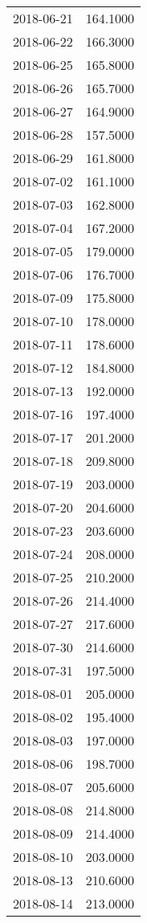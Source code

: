 \begin{tabular}{lr}
2018-06-21 &    164.1000 \\
2018-06-22 &    166.3000 \\
2018-06-25 &    165.8000 \\
2018-06-26 &    165.7000 \\
2018-06-27 &    164.9000 \\
2018-06-28 &    157.5000 \\
2018-06-29 &    161.8000 \\
2018-07-02 &    161.1000 \\
2018-07-03 &    162.8000 \\
2018-07-04 &    167.2000 \\
2018-07-05 &    179.0000 \\
2018-07-06 &    176.7000 \\
2018-07-09 &    175.8000 \\
2018-07-10 &    178.0000 \\
2018-07-11 &    178.6000 \\
2018-07-12 &    184.8000 \\
2018-07-13 &    192.0000 \\
2018-07-16 &    197.4000 \\
2018-07-17 &    201.2000 \\
2018-07-18 &    209.8000 \\
2018-07-19 &    203.0000 \\
2018-07-20 &    204.6000 \\
2018-07-23 &    203.6000 \\
2018-07-24 &    208.0000 \\
2018-07-25 &    210.2000 \\
2018-07-26 &    214.4000 \\
2018-07-27 &    217.6000 \\
2018-07-30 &    214.6000 \\
2018-07-31 &    197.5000 \\
2018-08-01 &    205.0000 \\
2018-08-02 &    195.4000 \\
2018-08-03 &    197.0000 \\
2018-08-06 &    198.7000 \\
2018-08-07 &    205.6000 \\
2018-08-08 &    214.8000 \\
2018-08-09 &    214.4000 \\
2018-08-10 &    203.0000 \\
2018-08-13 &    210.6000 \\
2018-08-14 &    213.0000 \\

\end{tabular}
